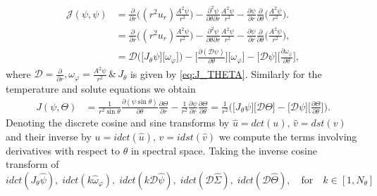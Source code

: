\documentclass[a4paper]{article}
\begin{document}
\begin{equation}
\begin{aligned}
 \mathcal{J}(\psi,\psi)  & =  \frac{\partial }{\partial r} \bigg( ( r^2 u_r) \frac{A^2 \psi}{r^2} \bigg) - \frac{\partial^2 \psi }{\partial \theta \partial r} \frac{A^2 \psi}{r^2} - \frac{\partial \psi }{\partial r} \frac{ \partial }{\partial \theta} \bigg( \frac{A^2 \psi}{r^2} \bigg).\\
 				& =  \frac{\partial }{\partial r} \bigg( ( r^2 u_r) \frac{A^2 \psi}{r^2} \bigg) - \frac{\partial^2 \psi }{\partial \theta \partial r} \frac{A^2 \psi}{r^2} - \frac{\partial \psi }{\partial r} \frac{ \partial }{\partial \theta} \bigg( \frac{A^2 \psi}{r^2} \bigg),\\
 				 & = \mathcal{D} \big( \big[ J_{\theta} \psi \big] \big[ \omega_{\varphi} \big] \big)  - \big[ \frac{ \partial (\mathcal{D} \psi )}{\partial \theta} \big] \big[  \omega_{\varphi} \big]  - \big[ \mathcal{D} \psi \big] \big[ \frac{ \partial \omega_{\varphi} }{\partial \theta}  \big],
\end{aligned}
\label{eq:VORT_NL}
\end{equation} 		
\noindent where $\mathcal{D} = \frac{\partial }{\partial r}, \omega_{\varphi} = \frac{A^2 \psi}{r^2} \, \& \, J_{\theta}$ is given by \eqref{eq:J_THETA}. Similarly for the temperature and solute equations we obtain
\begin{equation}
\begin{aligned}		 
J(\psi,\Theta) & = \frac{1}{r^2 \sin \theta} \frac{\partial (\psi \sin \theta) }{\partial  \theta} \frac{\partial \Theta }{\partial  r} - \frac{1}{r^2} \frac{\partial \psi}{\partial r} \frac{\partial \Theta }{\partial  \theta} = \frac{1}{r^2} \bigg( \big[ J_{\theta} \psi \big] \big[ \mathcal{D} \Theta \big] - \big[ \mathcal{D} \psi \big] \big[ \frac{\partial \Theta}{\partial \theta} \big] \bigg).
\end{aligned}
\label{eq:TEMP_NL}
\end{equation}
Denoting the discrete cosine and sine transforms by $\hat{u} = dct(u), \, \hat{v} =  dst(v)$ and their inverse by $u= idct(\hat{u}), \, v = idst(\hat{v})$ we compute the terms involving derivatives with respect to $\theta$ in spectral space.  Taking the inverse cosine transform of 
\begin{equation}
idct(J_{\theta} \hat{\psi}), \; idct(k \hat{\omega}_{\varphi}), \; idct(k\mathcal{D} \hat{\psi}), \; idct(\mathcal{D} \hat{\Sigma}), \; idct(\mathcal{D} \hat{\Theta}), \quad \text{for} \quad k \in [1,N_{\theta}]
\end{equation}
\end{document}
